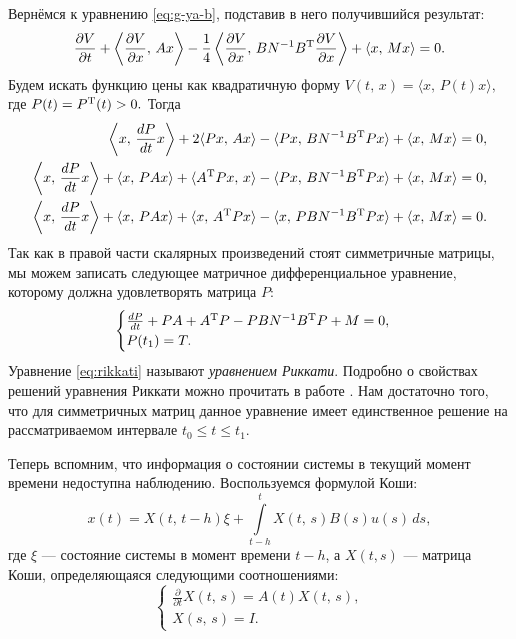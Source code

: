 Вернёмся к уравнению \eqref{eq:g-ya-b}, подставив в него получившийся результат:
$$
        \frac{\partial V}{\partial t}
        +
        \left\langle
        \frac{\partial V}{\partial x},\,Ax
        \right\rangle
        -
        \frac{1}{4}
        \left\langle
        \frac{\partial V}{\partial x},\,
        BN^{-1}B^\mathrm{T}\frac{\partial V}{\partial x}
        \right\rangle
        +
        \langle
        x,\,Mx
        \rangle
        = 0.
$$
Будем искать функцию цены как квадратичную форму
$
        V(t,\,x)
        =
        \langle x,\,P(t)x\rangle,
$
где
$
        P(t) = P^\mathrm{T}(t) > 0.
$
Тогда
\begin{align*}
\left\langle
x,\,\frac{dP}{dt} x
\right\rangle
+
2\langle
Px,\,Ax
\rangle
-
\langle
Px,\,BN^{-1}B^\mathrm{T} P x
\rangle
+
\langle
x,\,Mx
\rangle
&= 0,
\\
\left\langle
x,\,\frac{dP}{dt} x
\right\rangle
+
\langle
x,\,PAx
\rangle
+
\langle
A^\mathrm{T} P x,\,x
\rangle
-
\langle
Px,\,BN^{-1}B^\mathrm{T} P x
\rangle
+
\langle
x,\,Mx
\rangle
&= 0,
\\
\left\langle
x,\,\frac{dP}{dt} x
\right\rangle
+
\langle
x,\,PAx
\rangle
+
\langle
x,\,A^\mathrm{T} P x
\rangle
-
\langle
x,\,PBN^{-1}B^\mathrm{T} P x
\rangle
+
\langle
x,\,Mx
\rangle
&= 0.
\end{align*}
Так как в правой части скалярных произведений стоят симметричные матрицы, мы можем записать следующее матричное дифференциальное уравнение, которому должна удовлетворять матрица $P$:
\begin{equation}\label{eq:rikkati}
\begin{cases}
\frac{dP}{dt} + PA + A^\mathrm{T} P - PBN^{-1}B^\mathrm{T} P + M = 0,\\
P(t_1) = T.
\end{cases}
\end{equation}
Уравнение \eqref{eq:rikkati} называют \textit{уравнением Риккати}. Подробно о свойствах решений уравнения Риккати можно прочитать в работе \cite{egorov}. Нам достаточно того, что для симметричных матриц данное уравнение имеет единственное решение на рассматриваемом интервале $t_0\leqslant t\leqslant t_1$.

Теперь вспомним, что информация о состоянии системы в текущий момент времени недоступна наблюдению. Воспользуемся формулой Коши:
$$
x(t) = X(t,\,t-h)\xi + \int\limits_{t-h}^{t}X(t,\,s)B(s)u(s)\,ds,
$$
где $\xi$ --- состояние системы в момент времени $t- h$, а $X(t, s)$ --- матрица Коши, определяющаяся следующими соотношениями:
$$
        \begin{cases}
\frac{\partial}{\partial t}X(t,\,s) = A(t)X(t,\,s),\\
X(s,\,s) = I.
        \end{cases}
$$

